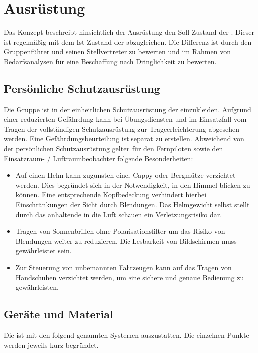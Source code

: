 \section{Ausrüstung}

Das Konzept beschreibt hinsichtlich der Ausrüstung den Soll-Zustand der \callee{}. Dieser ist regelmäßig mit dem Ist-Zustand der \callee{} abzugleichen. Die Differenz ist durch den Gruppenführer und seinen Stellvertreter zu bewerten und im Rahmen von Bedarfsanalysen für eine Beschaffung nach Dringlichkeit zu bewerten.

\subsection{Persönliche Schutzausrüstung}

Die Gruppe ist in der einheitlichen Schutzausrüstung der \unit{} einzukleiden.
Aufgrund einer reduzierten Gefährdung kann bei Übungsdiensten und im Einsatzfall vom Tragen der vollständigen Schutzausrüstung zur Trageerleichterung abgesehen werden. Eine Gefährdungsbeurteilung ist separat zu erstellen.
Abweichend von der persönlichen Schutzausrüstung gelten für den Fernpiloten sowie den Einsatzraum- / Luftraumbeobachter folgende Besonderheiten:

\begin{itemize}
\item Auf einen Helm kann zugunsten einer Cappy oder Bergmütze verzichtet werden. Dies begründet sich in der Notwendigkeit, in den Himmel blicken zu können. Eine entsprechende Kopfbedeckung verhindert hierbei Einschränkungen der Sicht durch Blendungen. Das Helmgewicht selbst stellt durch das anhaltende in die Luft schauen ein Verletzungsrisiko dar.
\item Tragen von Sonnenbrillen ohne Polarisationsfilter um das Risiko von Blendungen weiter zu reduzieren. Die Lesbarkeit von Bildschirmen muss gewährleistet sein.
\item Zur Steuerung von unbemannten Fahrzeugen kann auf das Tragen von Handschuhen verzichtet werden, um eine sichere und genaue Bedienung zu gewährleisten.
\end{itemize}

\subsection{Geräte und Material}

Die \callee{} ist mit den folgend genannten Systemen auszustatten. Die einzelnen Punkte werden jeweils kurz begründet.\\


